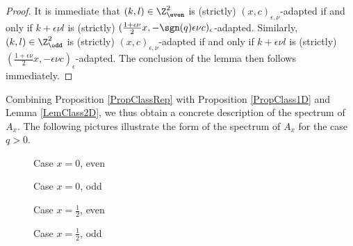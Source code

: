 \begin{proof} It is immediate that $(k,l)\in \Z^2_{\even}$ is (strictly) $(x,c)_{\epsilon,\nu}$-adapted if and only if $k+\epsilon\nu l$ is (strictly) $(\frac{1+\epsilon\nu}{2}x,-\sgn(q)\epsilon\nu c)_{\epsilon}$-adapted. Similarly, $(k,l)\in \Z^2_{\odd}$ is (strictly) $(x,c)_{\epsilon,\nu}$-adapted if and only if $k+\epsilon\nu l$ is (strictly) $(\frac{1+\epsilon\nu}{2}x,-\epsilon\nu c)_{\epsilon}$-adapted. The conclusion of the lemma then follows immediately.
\end{proof}

Combining Proposition \ref{PropClassRep} with Proposition \ref{PropClass1D} and Lemma \ref{LemClass2D}, we thus obtain a concrete description of the spectrum of $A_x$. The following pictures illustrate the form of the spectrum of $A_x$ for the case $q>0$.

\begin{figure}[h]
  \centering

  \caption{Case $x=0$, even}
\label{figy}
\end{figure}

\begin{figure}[h]
  \centering

  \caption{Case $x=0$, odd}
\label{figy}
\end{figure}


\begin{figure}[h]
  \centering

  \caption{Case $x=\frac{1}{2}$, even}
\label{figy}
\end{figure}


\begin{figure}[h]
  \centering
  
  
  \caption{Case $x=\frac{1}{2}$, odd}
\label{figy}
\end{figure}

%







